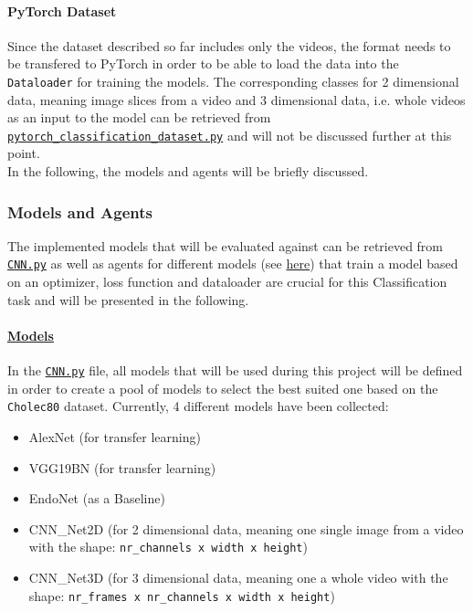 \documentclass{article}
\begin{document}
\paragraph{PyTorch Dataset}
Since the dataset described so far includes only the videos, the format needs to be transfered to PyTorch in order to be able to load the data into the \texttt{Dataloader} for training the models. The corresponding classes for 2 dimensional data, meaning image slices from a video and 3 dimensional data, i.e. whole videos as an input to the model can be retrieved from \href{https://github.com/amrane99/CAI-Classification/blob/AR/cai/data/pytorch/pytorch_classification_dataset.py}{\texttt{pytorch\_classification\_dataset.py}} and will not be discussed further at this point.\\

\noindent
In the following, the models and agents will be briefly discussed.

\subsubsection{Models and Agents}
The implemented models that will be evaluated against can be retrieved from \href{https://github.com/amrane99/CAI-Classification/blob/AR/cai/models/classification/CNN.py}{\texttt{CNN.py}} as well as agents for different models (see \href{https://github.com/amrane99/CAI-Classification/blob/AR/cai/agents/classification_agents.py}{here}) that train a model based on an optimizer, loss function and dataloader are crucial for this Classification task and will be presented in the following.

\paragraph{\href{https://github.com/amrane99/CAI-Classification/blob/AR/cai/models/classification/CNN.py}{Models}}
In the \href{https://github.com/amrane99/CAI-Classification/blob/AR/cai/models/classification/CNN.py}{\texttt{CNN.py}} file, all models that will be used during this project will be defined in order to create a pool of models to select the best suited one based on the \texttt{Cholec80} dataset. Currently, 4 different models have been collected:

\begin{itemize}
    \item AlexNet (for transfer learning)
    \item VGG19BN (for transfer learning)
    \item EndoNet (as a Baseline)
    \item CNN\_Net2D (for 2 dimensional data, meaning one single image from a video with the shape: \texttt{nr\_channels x width x height})
    \item CNN\_Net3D (for 3 dimensional data, meaning one a whole video with the shape: \texttt{nr\_frames x nr\_channels x width x height})
\end{itemize}
\end{document}
